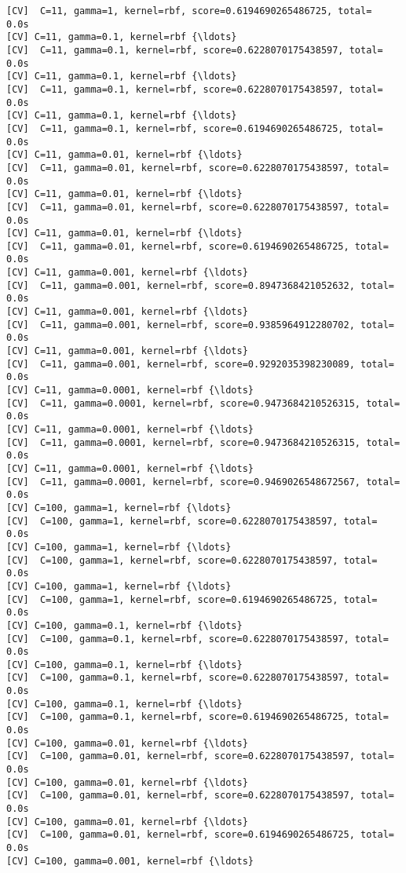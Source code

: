 \documentclass[11pt]{article}
\begin{document}
\begin{Verbatim}[commandchars=\\\{\}]
[CV]  C=11, gamma=1, kernel=rbf, score=0.6194690265486725, total=   0.0s
[CV] C=11, gamma=0.1, kernel=rbf {\ldots}
[CV]  C=11, gamma=0.1, kernel=rbf, score=0.6228070175438597, total=   0.0s
[CV] C=11, gamma=0.1, kernel=rbf {\ldots}
[CV]  C=11, gamma=0.1, kernel=rbf, score=0.6228070175438597, total=   0.0s
[CV] C=11, gamma=0.1, kernel=rbf {\ldots}
[CV]  C=11, gamma=0.1, kernel=rbf, score=0.6194690265486725, total=   0.0s
[CV] C=11, gamma=0.01, kernel=rbf {\ldots}
[CV]  C=11, gamma=0.01, kernel=rbf, score=0.6228070175438597, total=   0.0s
[CV] C=11, gamma=0.01, kernel=rbf {\ldots}
[CV]  C=11, gamma=0.01, kernel=rbf, score=0.6228070175438597, total=   0.0s
[CV] C=11, gamma=0.01, kernel=rbf {\ldots}
[CV]  C=11, gamma=0.01, kernel=rbf, score=0.6194690265486725, total=   0.0s
[CV] C=11, gamma=0.001, kernel=rbf {\ldots}
[CV]  C=11, gamma=0.001, kernel=rbf, score=0.8947368421052632, total=   0.0s
[CV] C=11, gamma=0.001, kernel=rbf {\ldots}
[CV]  C=11, gamma=0.001, kernel=rbf, score=0.9385964912280702, total=   0.0s
[CV] C=11, gamma=0.001, kernel=rbf {\ldots}
[CV]  C=11, gamma=0.001, kernel=rbf, score=0.9292035398230089, total=   0.0s
[CV] C=11, gamma=0.0001, kernel=rbf {\ldots}
[CV]  C=11, gamma=0.0001, kernel=rbf, score=0.9473684210526315, total=   0.0s
[CV] C=11, gamma=0.0001, kernel=rbf {\ldots}
[CV]  C=11, gamma=0.0001, kernel=rbf, score=0.9473684210526315, total=   0.0s
[CV] C=11, gamma=0.0001, kernel=rbf {\ldots}
[CV]  C=11, gamma=0.0001, kernel=rbf, score=0.9469026548672567, total=   0.0s
[CV] C=100, gamma=1, kernel=rbf {\ldots}
[CV]  C=100, gamma=1, kernel=rbf, score=0.6228070175438597, total=   0.0s
[CV] C=100, gamma=1, kernel=rbf {\ldots}
[CV]  C=100, gamma=1, kernel=rbf, score=0.6228070175438597, total=   0.0s
[CV] C=100, gamma=1, kernel=rbf {\ldots}
[CV]  C=100, gamma=1, kernel=rbf, score=0.6194690265486725, total=   0.0s
[CV] C=100, gamma=0.1, kernel=rbf {\ldots}
[CV]  C=100, gamma=0.1, kernel=rbf, score=0.6228070175438597, total=   0.0s
[CV] C=100, gamma=0.1, kernel=rbf {\ldots}
[CV]  C=100, gamma=0.1, kernel=rbf, score=0.6228070175438597, total=   0.0s
[CV] C=100, gamma=0.1, kernel=rbf {\ldots}
[CV]  C=100, gamma=0.1, kernel=rbf, score=0.6194690265486725, total=   0.0s
[CV] C=100, gamma=0.01, kernel=rbf {\ldots}
[CV]  C=100, gamma=0.01, kernel=rbf, score=0.6228070175438597, total=   0.0s
[CV] C=100, gamma=0.01, kernel=rbf {\ldots}
[CV]  C=100, gamma=0.01, kernel=rbf, score=0.6228070175438597, total=   0.0s
[CV] C=100, gamma=0.01, kernel=rbf {\ldots}
[CV]  C=100, gamma=0.01, kernel=rbf, score=0.6194690265486725, total=   0.0s
[CV] C=100, gamma=0.001, kernel=rbf {\ldots}

\end{Verbatim}
\end{document}
